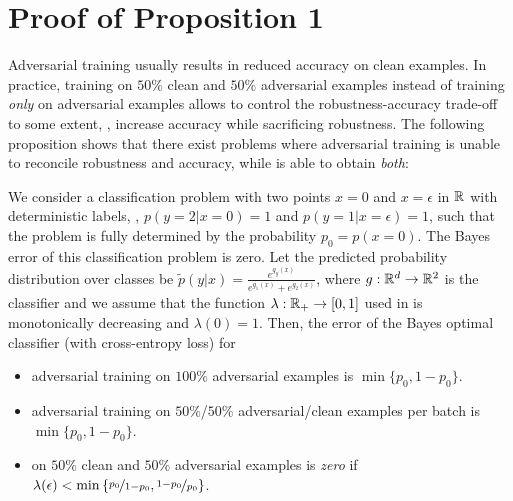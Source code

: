 \section{Proof of Proposition 1}
\label{sec:supp-proof}

Adversarial training usually results in reduced accuracy on clean examples. In practice, training on $50\%$ clean and  $50\%$ adversarial examples instead of training \emph{only} on adversarial examples allows to control the robustness-accuracy trade-off to some extent, \ie, increase accuracy while sacrificing robustness. The following proposition shows that there exist problems where adversarial training is unable to reconcile robustness and accuracy, while \ConfTrain is able to obtain \emph{both}:

\begin{proposition}\label{prop:toy-example}
    We consider a classification problem with two points $x=0$ and $x=\epsilon$ in $\mR$ with deterministic labels, \ie,
    $p(y=2|x=0)=1$ and $p(y=1|x=\epsilon)=1$, such that the problem is fully determined by the probability $p_0=p(x=0)$. 
    The Bayes error of this classification problem is zero. Let the predicted probability distribution over classes be $\tilde{p}(y|x)=\frac{e^{g_y(x)}}{e^{g_1(x)}+e^{g_2(x)}}$, where $g:\R^d \rightarrow \R^2$ is the classifier and we assume that the function $\lambda:\mR_+ \rightarrow [0,1]$ used in \ConfTrain is monotonically decreasing and $\lambda(0)=1$. Then, the error of the Bayes optimal classifier (with cross-entropy loss) for
    \vspace*{-8px}
    \begin{itemize}
        \item adversarial training on $100\%$ adversarial examples
        is $\min\{p_0,1-p_0\}$.
        \vspace*{-3px}
        \item adversarial training on $50\%$/$50\%$ adversarial/clean examples per batch
        is $\min\{p_0,1 - p_0\}$.
        \vspace*{-3px}
        \item \ConfTrain on $50\%$ clean and $50\%$ adversarial examples 
        is \emph{zero} 
        if $\lambda(\epsilon) < \min\left\{\nicefrac{p_0}{1-p_0},\nicefrac{1-p_0}{p_0}\right\}$.
        \vspace*{-6px}
    \end{itemize}
\end{proposition}

